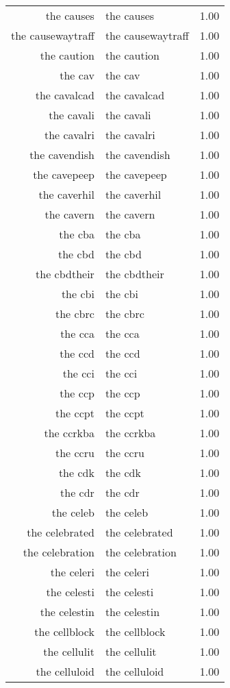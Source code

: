 \begin{table}[ht]
\begin{tabular}{rlr}
  the causes & the causes & 1.00 \\ 
  the causewaytraff & the causewaytraff & 1.00 \\ 
  the caution & the caution & 1.00 \\ 
  the cav & the cav & 1.00 \\ 
  the cavalcad & the cavalcad & 1.00 \\ 
  the cavali & the cavali & 1.00 \\ 
  the cavalri & the cavalri & 1.00 \\ 
  the cavendish & the cavendish & 1.00 \\ 
  the cavepeep & the cavepeep & 1.00 \\ 
  the caverhil & the caverhil & 1.00 \\ 
  the cavern & the cavern & 1.00 \\ 
  the cba & the cba & 1.00 \\ 
  the cbd & the cbd & 1.00 \\ 
  the cbdtheir & the cbdtheir & 1.00 \\ 
  the cbi & the cbi & 1.00 \\ 
  the cbrc & the cbrc & 1.00 \\ 
  the cca & the cca & 1.00 \\ 
  the ccd & the ccd & 1.00 \\ 
  the cci & the cci & 1.00 \\ 
  the ccp & the ccp & 1.00 \\ 
  the ccpt & the ccpt & 1.00 \\ 
  the ccrkba & the ccrkba & 1.00 \\ 
  the ccru & the ccru & 1.00 \\ 
  the cdk & the cdk & 1.00 \\ 
  the cdr & the cdr & 1.00 \\ 
  the celeb & the celeb & 1.00 \\ 
  the celebrated & the celebrated & 1.00 \\ 
  the celebration & the celebration & 1.00 \\ 
  the celeri & the celeri & 1.00 \\ 
  the celesti & the celesti & 1.00 \\ 
  the celestin & the celestin & 1.00 \\ 
  the cellblock & the cellblock & 1.00 \\ 
  the cellulit & the cellulit & 1.00 \\ 
  the celluloid & the celluloid & 1.00 \\ 

\end{tabular}
\end{table}
